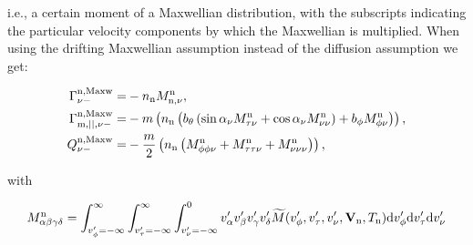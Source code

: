 \noindent i.e., a certain moment of a Maxwellian distribution, with the subscripts indicating the particular velocity components by which the Maxwellian is multiplied. When using the drifting Maxwellian assumption instead of the diffusion assumption we get:

\begin{align}
\Gamma_{\nu-}^{\mathrm{n,Maxw}} =& - n_{\mathrm{n}} M^\mathrm{n}_{\mathrm{n},\nu} ,   \label{eq:Gammanin2_maxw} \\
\Gamma_{\mathrm{m},||,\nu-}^{\mathrm{n,Maxw}} =& -m \left( n_{\mathrm{n}} \left( b_{\theta} \left( \sin \alpha_{\nu} M^\mathrm{n}_{\tau\nu} + \cos \alpha_{\nu} M^\mathrm{n}_{\nu\nu} \right) + b_{\phi} M^\mathrm{n}_{\phi\nu} \right) \right), \label{eq:Gammamompin_maxw} \\
Q_{\nu-}^{\mathrm{n,Maxw}} =& -\frac{m}{2} \left( n_{\mathrm{n}} \left( M^\mathrm{n}_{\phi\phi\nu} + M^\mathrm{n}_{\tau\tau\nu} + M^\mathrm{n}_{\nu\nu\nu} \right) \right), \label{eq:Qnin_maxw}
\end{align}

with

\begin{equation}
M^\mathrm{n}_{\alpha\beta\gamma\delta} = \int_{v_{\phi}'=-\infty}^{\infty} \int_{v_{\tau}'=-\infty}^{\infty} \int_{v_{\nu}' = - \infty}^{0} v_{\alpha}' v_{\beta}' v_{\gamma}' v_{\delta}' \widetilde{M}(v_{\phi}',v_{\tau}',v_{\nu}',{\bf V}_{\mathrm{n}},T_{\mathrm{n}}) \mathrm{d} v_{\phi}' \mathrm{d} v_{\tau}' \mathrm{d} v_{\nu}'\end{equation}

